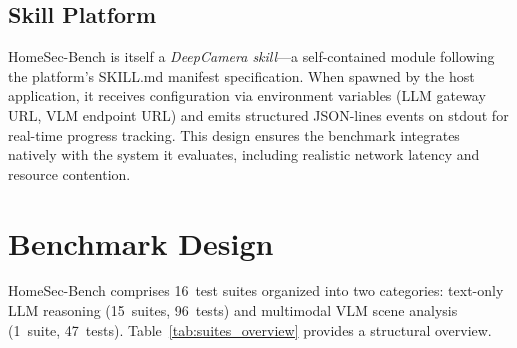 \documentclass[onecolumn,10pt]{IEEEtran}
\begin{document}
\subsection{Skill Platform}
HomeSec-Bench is itself a \emph{DeepCamera skill}---a self-contained
module following the platform's SKILL.md manifest specification. When
spawned by the host application, it receives configuration via
environment variables (LLM gateway URL, VLM endpoint URL) and emits
structured JSON-lines events on stdout for real-time progress tracking.
This design ensures the benchmark integrates natively with the system
it evaluates, including realistic network latency and resource
contention.


\section{Benchmark Design}

HomeSec-Bench comprises 16~test suites organized into two categories:
text-only LLM reasoning (15~suites, 96~tests) and multimodal VLM scene
analysis (1~suite, 47~tests). Table~\ref{tab:suites_overview} provides
a structural overview.
\end{document}

